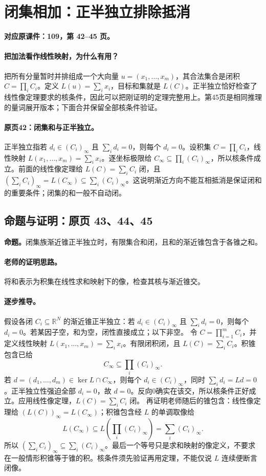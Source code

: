 \documentclass[11pt,a4paper]{article}
\newcommand{\R}{\mathbb{R}}\newcommand{\N}{\mathbb{N}}
\theoremstyle{definition}\newtheorem{definition}{定义}\newtheorem{example}{例}
\begin{document}
\clearpage\section{闭集相加：正半独立排除抵消}\label{g:109:42}

\textbf{对应原课件：109，第 42--45 页。}


\paragraph{把加法看作线性映射，为什么有用？}
把所有分量暂时并排组成一个大向量 $u=(x_1,\ldots,x_m)$，其合法集合是闭积 $C=\prod_iC_i$。定义 $L(u)=\sum_i x_i$，目标和集就是 $L(C)$。正半独立恰好检查了线性像定理要求的核条件，因此可以把刚证明的定理完整用上。第45页是相同推理的量词展开版本；下面合并保留全部核条件验证。


\paragraph{原页42：闭集和与正半独立。}正半独立指若 $d_i\in(C_i)_\infty$ 且 $\sum_i d_i=0$，则每个 $d_i=0$。设积集 $C=\prod_iC_i$，线性映射 $L(x_1,\ldots,x_m)=\sum_i x_i$。逐坐标极限给 $C_\infty\subseteq\prod_i(C_i)_\infty$，所以核条件成立。前面的线性像定理给 $L(C)=\sum_iC_i$ 闭，且 $(\sum_i C_i)_\infty=L(C_\infty)\subseteq\sum_i(C_i)_\infty$。这说明渐近方向不能互相抵消是保证闭和的重要条件；闭集的和一般不自动闭。



\subsection{命题与证明：原页 43、44、45}

\textbf{命题。}闭集族渐近锥正半独立时，有限集合和闭，且和的渐近锥包含于各锥之和。

\paragraph{老师的证明思路。}将和表示为积集在线性求和映射下的像，检查其核与渐近锥交。

\paragraph{逐步推导。}
假设各闭 $C_i\subseteq\R^N$ 的渐近锥正半独立：若 $d_i\in(C_i)_\infty$ 且 $\sum_i d_i=0$，则每个 $d_i=0$。若某因子空，和为空，闭性直接成立；以下非空。
令 $C=\prod_{i=1}^mC_i$，并定义线性映射 $L(x_1,\ldots,x_m)=\sum_i x_i$。有限闭积闭，且 $L(C)=\sum_iC_i$。积锥包含已给
\[C_\infty\subseteq\prod_i(C_i)_\infty.\]
若 $d=(d_1,\ldots,d_m)\in\ker L\cap C_\infty$，则每个 $d_i\in(C_i)_\infty$，同时 $\sum_id_i=Ld=0$。正半独立性强迫全部 $d_i=0$，故 $d=0$。反向0确实在该交，所以核条件正好成立。应用线性像定理，$L(C)=\sum_iC_i$ 闭。
再证明老师随后的锥包含：线性像定理给 $(L(C))_\infty=L(C_\infty)$；积锥包含经 $L$ 的单调取像给
\[L(C_\infty)\subseteq L\left(\prod_i(C_i)_\infty\right)=\sum_i(C_i)_\infty.\]
所以 $(\sum_iC_i)_\infty\subseteq\sum_i(C_i)_\infty$。最后一个等号只是求和映射的像定义，不要求在一般情形积锥等于锥的积。核条件须先验证再用定理，不能仅说 $L$ 连续便断言闭像。
\end{document}
